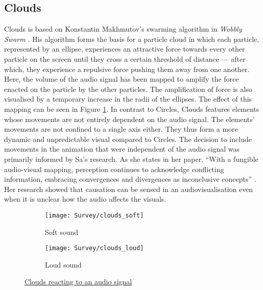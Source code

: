 \documentclass[../initial_thesis.tex]{subfiles}
\begin{document}
\subsection{Clouds}
Clouds is based on Konstantin Makhmutov's swarming algorithm in \textit{Wobbly Swarm} \cite{Makhmutov}. His algorithm forms the basis for a particle cloud in which each particle, represented by an ellipse, experiences an attractive force towards every other particle on the screen until they cross a certain threshold of distance --- after which, they experience a repulsive force pushing them away from one another. Here, the volume of the audio signal has been mapped to amplify the force enacted on the particle by the other particles. The amplification of force is also visualised by a temporary increase in the radii of the ellipses. The effect of this mapping can be seen in Figure \ref{fig:clouds1}. In contrast to Circles, Clouds features elements whose movements are not entirely dependent on the audio signal. The elements' movements are not confined to a single axis either. They thus form a more dynamic and unpredictable visual compared to Circles. The decision to include movements in the animation that were independent of the audio signal was primarily informed by Sa's research. As she states in her paper, ``With a fungible audio-visual mapping, perception continues to acknowledge conflicting information, embracing convergences and divergences as inconclusive concepts'' \cite{Sa2014}. Her research showed that causation can be sensed in an audiovisualisation even when it is unclear how the audio affects the visuals. 

\begin{figure}
  \begin{subfigure}{0.5\textwidth}
    \texttt{[image: Survey/clouds\_soft]}
    \caption{Soft sound}
  \end{subfigure} 
  \begin{subfigure}{0.5\textwidth}
    \texttt{[image: Survey/clouds\_loud]}
    \caption{Loud sound}
  \end{subfigure}
  \caption{\href{https://vimeo.com/326766069}{Clouds reacting to an audio signal}}
  \label{fig:clouds1}
\end{figure}
\end{document}
